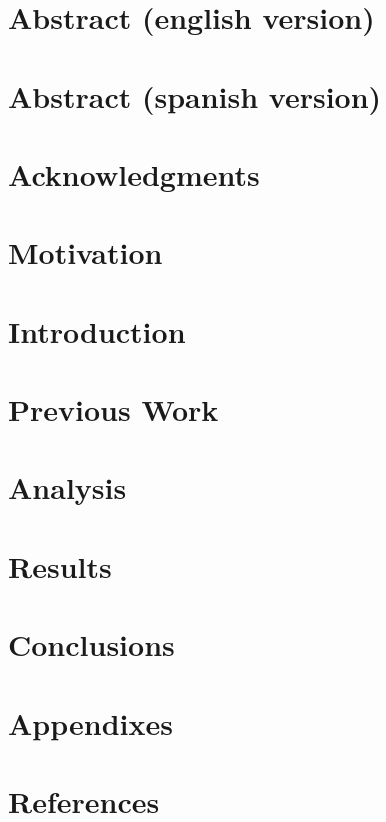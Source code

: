 \documentclass[11pt,a4paper,twosides]{tesis}
\begin{document}
\def\autor{Pablo Agustín Artuso \\ LU: 282/11 \\ artusopablo@gmail.com}
\def\tituloTesis{Studying the logging capability of Windows Telemetry component using Reverse Engineering}
\def\runtitle{}
\def\director{Rodolfo Baader $<$rbaader@dc.uba.ar$>$}
\def\codirector{Aleksandar Milenkoski $<$amilenkoski@ernw.de$>$}
\def\lugar{Buenos Aires, 2019}


\chapter*{Abstract (english version)}
    

\chapter*{Abstract (spanish version)}
    

\chapter*{Acknowledgments}
    

\tableofcontents

\chapter{Motivation}
    

\chapter{Introduction}
    

\chapter{Previous Work}
    

\chapter{Analysis}
    

\chapter{Results}
    

\chapter{Conclusions}
    

\chapter{Appendixes}
    

\chapter{References}
    
\end{document}
